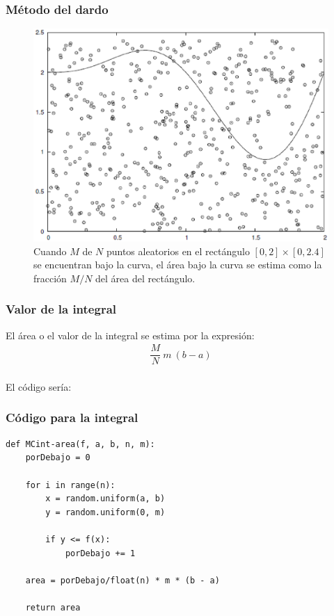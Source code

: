 \documentclass[12pt]{beamer}
\begin{document}
\begin{frame}
\frametitle{Método del dardo}
\begin{figure}
	\centering
	\includegraphics[scale=0.4]{Imagenes/integracionCaja.eps}
	\caption{\tiny{Cuando $M$ de $N$ puntos aleatorios en el rectángulo $[0, 2] \times [0, 2.4]$ se encuentran bajo la curva, el área bajo la curva se estima como la fracción $M / N$ del área del rectángulo.}}
\end{figure}
\end{frame}
\begin{frame}
\frametitle{Valor de la integral}
El área o el valor de la integral se estima por la expresión:
\pause
\begin{align*}
\dfrac{M}{N} \: m \: (b - a)
\end{align*}
\\
\bigskip
El código sería:
\end{frame}
\begin{frame}
\frametitle{Código para la integral}
\begin{lstlisting}[caption=Código para el método del dardo, style=FormattedNumber, basicstyle=\linespread{1.1}\ttfamily=\small, columns=fullflexible]
def MCint-area(f, a, b, n, m):
    porDebajo = 0 
    
    for i in range(n):
        x = random.uniform(a, b)
        y = random.uniform(0, m)
    
        if y <= f(x):
            porDebajo += 1
    
    area = porDebajo/float(n) * m * (b - a)
    
    return area
\end{lstlisting}
\end{frame}
\end{document}

